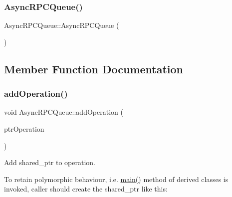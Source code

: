 \mbox{\label{class_async_r_p_c_queue_a6f4360b02696e4e9f0a2d71d664b0663}} 
\subsubsection{\texorpdfstring{Async\+R\+P\+C\+Queue()}{AsyncRPCQueue()}\hspace{0.1cm}{\footnotesize\ttfamily [3/3]}}
{\footnotesize\ttfamily Async\+R\+P\+C\+Queue\+::\+Async\+R\+P\+C\+Queue (\begin{DoxyParamCaption}\item[{\mbox{\hyperlink{class_async_r_p_c_queue}{Async\+R\+P\+C\+Queue}} \&\&}]{ }\end{DoxyParamCaption})\hspace{0.3cm}{\ttfamily [delete]}}



\subsection{Member Function Documentation}
\mbox{\label{class_async_r_p_c_queue_a921166cf7a5f25723c13b2f01d35edaa}} 
\subsubsection{\texorpdfstring{add\+Operation()}{addOperation()}}
{\footnotesize\ttfamily void Async\+R\+P\+C\+Queue\+::add\+Operation (\begin{DoxyParamCaption}\item[{const std\+::shared\+\_\+ptr$<$ \mbox{\hyperlink{class_async_r_p_c_operation}{Async\+R\+P\+C\+Operation}} $>$ \&}]{ptr\+Operation }\end{DoxyParamCaption})}

Add shared\+\_\+ptr to operation.

To retain polymorphic behaviour, i.\+e. \mbox{\hyperlink{bitcoin-cli_8cpp_a0ddf1224851353fc92bfbff6f499fa97}{main()}} method of derived classes is invoked, caller should create the shared\+\_\+ptr like this\+:

